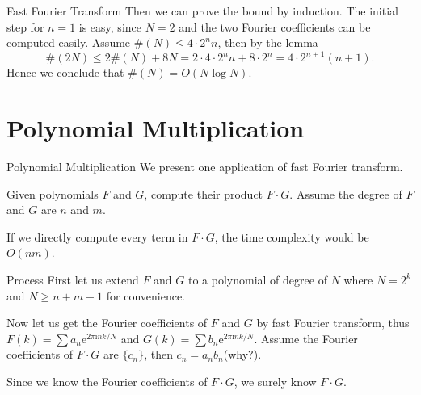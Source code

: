 \documentclass{beamer}
\begin{document}
\begin{frame}{Fast Fourier Transform}
    Then we can prove the bound by induction. The initial step for $n = 1$ is easy, since $N = 2$ and the two Fourier coefficients can be computed easily. Assume $\#(N) \le 4 \cdot 2^nn$, then by the lemma
    $$
    \#(2N) \le 2 \#(N) + 8N = 2 \cdot 4 \cdot 2^nn + 8 \cdot 2^n = 4\cdot2^{n + 1}(n + 1).
    $$
    Hence we conclude that $\#(N) = O(N \log N)$.
\end{frame}


\section{Polynomial Multiplication}

\begin{frame}{Polynomial Multiplication}
    We present one application of fast Fourier transform.

    \vspace{1em}

    \pause

    Given polynomials $F$ and $G$, compute their product $F \cdot G$. Assume the degree of $F$ and $G$ are $n$ and $m$.

    \vspace{1em}

    \pause

    If we directly compute every term in $F \cdot G$, the time complexity would be $O(nm)$.
\end{frame}

\begin{frame}{Process}
    First let us extend $F$ and $G$ to a polynomial of degree of $N$ where $N = 2^k$ and $N \ge n + m - 1$ for convenience.
    
    \pause

    Now let us get the Fourier coefficients of $F$ and $G$ by fast Fourier transform, thus $F(k) = \sum a_n \text{e}^{2 \pi\text{i}nk/N}$ and $G(k) = \sum b_n \text{e}^{2 \pi \text{i}nk/N}$. 
    Assume the Fourier coefficients of $F \cdot G$ are $\{c_n\}$, then $c_n = a_nb_n$(why?).

    \pause

    Since we know the Fourier coefficients of $F \cdot G$, we surely know $F \cdot G$.
    
\end{frame}
\end{document}
